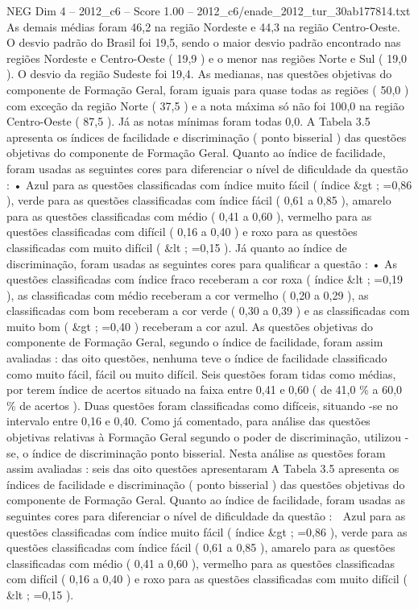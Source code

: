 \begin{textsample}{NEG Dim 4 – 2012\_c6 – Score 1.00 – 2012\_c6/enade\_2012\_tur\_30ab177814.txt}
As demais médias foram 46,2 na região Nordeste e 44,3 na região Centro-Oeste.
O desvio padrão do Brasil foi 19,5, sendo o maior desvio padrão encontrado nas regiões Nordeste e Centro-Oeste ( 19,9 ) e o menor nas regiões Norte e Sul ( 19,0 ).
O desvio da região Sudeste foi 19,4.
As medianas, nas questões objetivas do componente de Formação Geral, foram iguais para quase todas as regiões ( 50,0 ) com exceção da região Norte ( 37,5 ) e a nota máxima só não foi 100,0 na região Centro-Oeste ( 87,5 ).
Já as notas mínimas foram todas 0,0.
A Tabela 3.5 apresenta os índices de facilidade e discriminação ( ponto bisserial ) das questões objetivas do componente de Formação Geral.
Quanto ao índice de facilidade, foram usadas as seguintes cores para diferenciar o nível de dificuldade da questão : • Azul para as questões classificadas com índice muito fácil ( índice \&gt ; =0,86 ), verde para as questões classificadas com índice fácil ( 0,61 a 0,85 ), amarelo para as questões classificadas com médio ( 0,41 a 0,60 ), vermelho para as questões classificadas com difícil ( 0,16 a 0,40 ) e roxo para as questões classificadas com muito difícil ( \&lt ; =0,15 ).
Já quanto ao índice de discriminação, foram usadas as seguintes cores para qualificar a questão : • As questões classificadas com índice fraco receberam a cor roxa ( índice \&lt ; =0,19 ), as classificadas com médio receberam a cor vermelho ( 0,20 a 0,29 ), as classificadas com bom receberam a cor verde ( 0,30 a 0,39 ) e as classificadas com muito bom ( \&gt ; =0,40 ) receberam a cor azul.
As questões objetivas do componente de Formação Geral, segundo o índice de facilidade, foram assim avaliadas : das oito questões, nenhuma teve o índice de facilidade classificado como muito fácil, fácil ou muito difícil.
Seis questões foram tidas como médias, por terem índice de acertos situado na faixa entre 0,41 e 0,60 ( de 41,0 \% a 60,0 \% de acertos ).
Duas questões foram classificadas como difíceis, situando -se no intervalo entre 0,16 e 0,40.
Como já comentado, para análise das questões objetivas relativas à Formação Geral segundo o poder de discriminação, utilizou -se, o índice de discriminação ponto bisserial.
Nesta análise as questões foram assim avaliadas : seis das oito questões apresentaram A Tabela 3.5 apresenta os índices de facilidade e discriminação ( ponto bisserial ) das questões objetivas do componente de Formação Geral.
Quanto ao índice de facilidade, foram usadas as seguintes cores para diferenciar o nível de dificuldade da questão :  Azul para as questões classificadas com índice muito fácil ( índice \&gt ; =0,86 ), verde para as questões classificadas com índice fácil ( 0,61 a 0,85 ), amarelo para as questões classificadas com médio ( 0,41 a 0,60 ), vermelho para as questões classificadas com difícil ( 0,16 a 0,40 ) e roxo para as questões classificadas com muito difícil ( \&lt ; =0,15 ).

\end{textsample}

